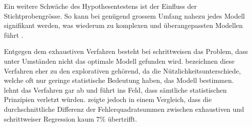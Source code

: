 Ein weitere Schwäche des Hypothesentestens ist der Einfluss der Stichtprobengrösse. So kann bei genügend grossem Umfang nahezu jedes Modell  signifikant werden, was wiederum zu komplexen und überangepassten Modellen führt \cite[p.173]{weakliem2004introduction}.

Entgegen dem exhaustiven Verfahren besteht bei schrittweisen das Problem, dass unter Umständen nicht das optimale Modell gefunden wird. 
 bezeichnen diese Verfahren eher zu den explorativen gehörend, da die Nützlichkeitsunterschiede, welche oft nur geringe statistische Bedeutung haben, das Modell bestimmen.
 lehnt das Verfahren gar ab und führt ins Feld, dass sämtliche statistischen Prinzipien verletzt würden. 
 zeigte jedoch in einem Vergleich, dass die durchschnittliche Differenz der Fehlerquadratsummen zwischen exhaustiven und schrittweiser Regression kaum 7\% übertrifft. 